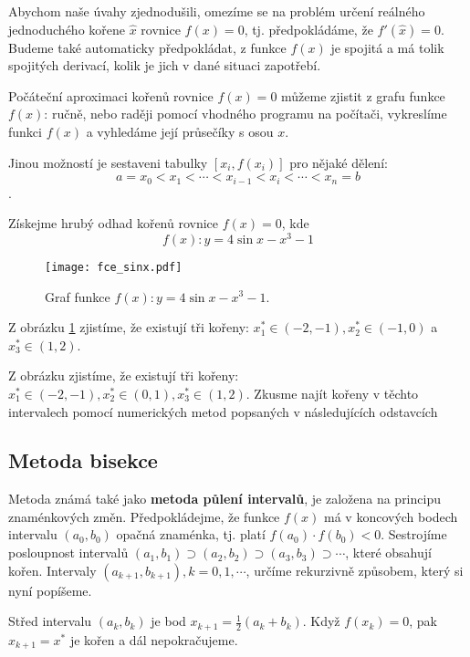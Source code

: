     Abychom naše úvahy zjednodušili, omezíme se na problém určení re\-ál\-né\-ho
    je\-dno\-du\-ché\-ho kořene $\hat{x}$ rovnice $f(x)=0$, tj. předpokládáme, že $f'(\hat{x})=0$.
    Budeme také automaticky předpokládat, z funkce $f(x)$ je spojitá a má tolik spojitých derivací,
    kolik je jich v dané situaci zapotřebí.

    Počáteční aproximaci kořenů rovnice $f(x)=0$ můžeme zjistit z grafu funkce $f(x)$: ručně, nebo
    raději pomocí vhodného programu na počítači, vykreslíme funkci $f(x)$ a vyhledáme její
    průsečíky s osou $x$.

    Jinou možností je sestaveni tabulky $[x_i,f(x_i)]$ pro nějaké dělení:
    $$a=x_0<x_1<\cdots<x_{i-1}<x_i<\cdots<x_n=b$$.
    \begin{example} Získejme hrubý odhad kořenů rovnice $f(x) = 0$, kde $$f(x):y=4\sin x - x^3 - 1$$
      \begin{figure}[t]
        \centering
        \texttt{[image: fce\_sinx.pdf]}
        \caption[Graf funkce $f(x):y=4\sin x - x^3 - 1$.]{Graf funkce $f(x):y=4\sin x - x^3 - 1$.}
        \label{nm:fig_ex_fce_sinx}
      \end{figure}
      Z obrázku \ref{nm:fig_ex_fce_sinx} zjistíme, že existují tři kořeny: $x_1^*\in(-2,-1),
      x_2^*\in(-1, 0)$ a $x_3^*\in(1, 2)$.
    \end{example}

    Z obrázku zjistíme, že existují tři kořeny: $x_1^*\in(-2,-1),x_2^*\in(0,1),x_3^*\in(1,2)$.
    Zkusme najít kořeny v těchto intervalech pomocí numerických metod popsaných v následujících
    odstavcích

  \subsection{Metoda bisekce}
    Metoda známá také jako \textbf{metoda půlení intervalů}, je založena na principu
    zna\-mén\-ko\-vých změn. Předpokládejme, že funkce $f(x)$ má v koncových bodech intervalu
    $(a_0,b_0)$ opačná znaménka, tj. platí $f(a_0 )\cdot f(b_0 )<0$. Sestrojíme posloupnost
    intervalů $(a_1,b_1)\supset(a_2,b_2)\supset(a_3,b_3)\supset\cdots$, které obsahují kořen.
    Intervaly $(a_{k+1},b_{k+1}), k=0,1,\cdots$, určíme rekurzivně způsobem, který si nyní
    popíšeme.

    Střed intervalu $(a_k,b_k)$ je bod $x_{k+1}=\frac{1}{2}(a_k+b_k)$. Když $f(x_k)=0$, pak
    $x_{k+1}=x^*$ je kořen a dál nepokračujeme.
    